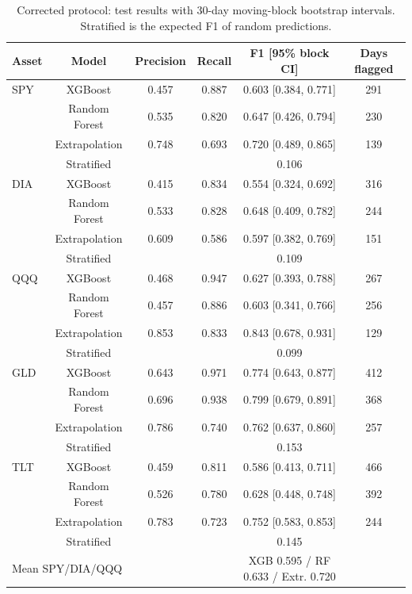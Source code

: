 \documentclass[11pt,a4paper]{article}
\begin{document}
\begin{table}[h]
\centering
\small
\begin{tabular}{lccccc}
\toprule
Asset & Model & Precision & Recall & F1 [95\% block CI] & Days flagged \\
\midrule
SPY & XGBoost & 0.457 & 0.887 & 0.603 [0.384, 0.771] & 291 \\
    & Random Forest & 0.535 & 0.820 & 0.647 [0.426, 0.794] & 230 \\
    & Extrapolation & 0.748 & 0.693 & 0.720 [0.489, 0.865] & 139 \\
    & Stratified & & & 0.106 & \\
\midrule
DIA & XGBoost & 0.415 & 0.834 & 0.554 [0.324, 0.692] & 316 \\
    & Random Forest & 0.533 & 0.828 & 0.648 [0.409, 0.782] & 244 \\
    & Extrapolation & 0.609 & 0.586 & 0.597 [0.382, 0.769] & 151 \\
    & Stratified & & & 0.109 & \\
\midrule
QQQ & XGBoost & 0.468 & 0.947 & 0.627 [0.393, 0.788] & 267 \\
    & Random Forest & 0.457 & 0.886 & 0.603 [0.341, 0.766] & 256 \\
    & Extrapolation & 0.853 & 0.833 & 0.843 [0.678, 0.931] & 129 \\
    & Stratified & & & 0.099 & \\
\midrule
GLD & XGBoost & 0.643 & 0.971 & 0.774 [0.643, 0.877] & 412 \\
    & Random Forest & 0.696 & 0.938 & 0.799 [0.679, 0.891] & 368 \\
    & Extrapolation & 0.786 & 0.740 & 0.762 [0.637, 0.860] & 257 \\
    & Stratified & & & 0.153 & \\
\midrule
TLT & XGBoost & 0.459 & 0.811 & 0.586 [0.413, 0.711] & 466 \\
    & Random Forest & 0.526 & 0.780 & 0.628 [0.448, 0.748] & 392 \\
    & Extrapolation & 0.783 & 0.723 & 0.752 [0.583, 0.853] & 244 \\
    & Stratified & & & 0.145 & \\
\midrule
\multicolumn{2}{l}{Mean SPY/DIA/QQQ} & & & XGB 0.595 / RF 0.633 / Extr. 0.720 & \\
\bottomrule
\end{tabular}
\caption{Corrected protocol: test results with 30-day moving-block bootstrap intervals.
Stratified is the expected F1 of random predictions.}
\label{tab:main}
\end{table}
\end{document}
